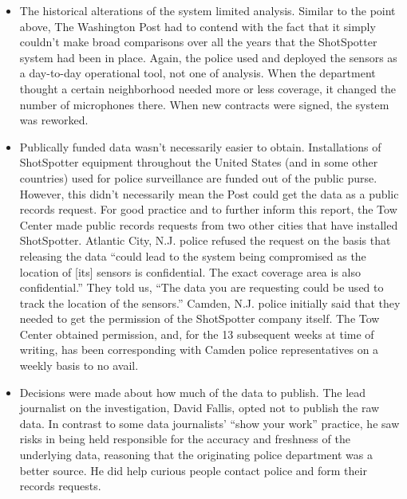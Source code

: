 \begin{itemize}
\item The historical alterations of the system limited analysis.
Similar to the point above, The Washington Post had to contend with
the fact that it simply couldn't make broad comparisons over all the
years that the ShotSpotter system had been in place. Again, the police
used and deployed the sensors as a day-to-day operational tool, not
one of analysis. When the department thought a certain neighborhood
needed more or less coverage, it changed the number of microphones
there. When new contracts were signed, the system was reworked.
\item Publically funded data wasn't necessarily easier to obtain.
Installations of ShotSpotter equipment throughout the United States
(and in some other countries) used for police surveillance are funded
out of the public purse. However, this didn't necessarily mean the Post
could get the data as a public records request. For good practice and
to further inform this report, the Tow Center made public records
requests from two other cities that have installed ShotSpotter. Atlantic
City, N.J. police refused the request on the basis that releasing the
data ``could lead to the system being compromised as the location of
[its] sensors is confidential. The exact coverage area is also confidential.''
They told us, ``The data you are requesting could be used to track
the location of the sensors.'' Camden, N.J. police initially said that they
needed to get the permission of the ShotSpotter company itself. The
Tow Center obtained permission, and, for the 13 subsequent weeks at
time of writing, has been corresponding with Camden police representatives
on a weekly basis to no avail.
\item Decisions were made about how much of the data to publish.
The lead journalist on the investigation, David Fallis, opted not to
publish the raw data. In contrast to some data journalists' ``show your
work'' practice, he saw risks in being held responsible for the accuracy
and freshness of the underlying data, reasoning that the originating
police department was a better source. He did help curious people
contact police and form their records requests.
\end{itemize}

